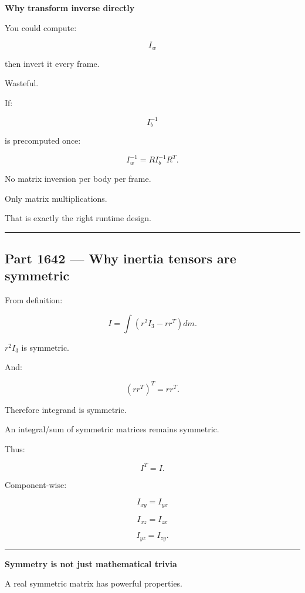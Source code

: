 \textbf{Why transform inverse directly}

You could compute:

\[
I_w
\]

then invert it every frame.

Wasteful.

If:

\[
I_b^{-1}
\]

is precomputed once:

\[
I_w^{-1}
=
RI_b^{-1}R^T.
\]

No matrix inversion per body per frame.

Only matrix multiplications.

That is exactly the right runtime design.

\begin{center}\rule{0.5\linewidth}{0.5pt}\end{center}

\subsection{Part 1642 --- Why inertia tensors are symmetric}\label{06-engine-ii-ch035-part-1642-why-inertia-tensors-are-symmetric}

\hypertarget{06-engine-ii-ch035-part-1642-why-inertia-tensors-are-symmetric}{}

From definition:

\[
I
=
\int
(
r^2I_3
-
rr^T
)
dm.
\]

\(r^2I_3\) is symmetric.

And:

\[
(rr^T)^T
=
rr^T.
\]

Therefore integrand is symmetric.

An integral/sum of symmetric matrices remains symmetric.

Thus:

\[
\boxed{
I^T=I.
}
\]

Component-wise:

\[
I_{xy}=I_{yx}
\]

\[
I_{xz}=I_{zx}
\]

\[
I_{yz}=I_{zy}.
\]

\begin{center}\rule{0.5\linewidth}{0.5pt}\end{center}

\textbf{Symmetry is not just mathematical trivia}

A real symmetric matrix has powerful properties.

